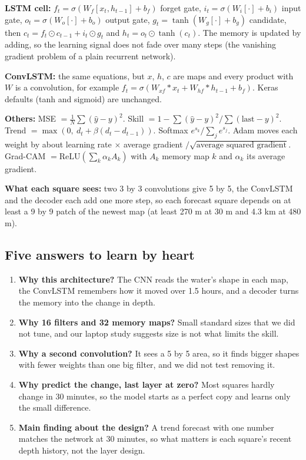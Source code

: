 \textbf{LSTM cell:} $f_t=\sigma(W_f[x_t,h_{t-1}]+b_f)$ forget gate, $i_t=\sigma(W_i[\cdot]+b_i)$ input gate, $o_t=\sigma(W_o[\cdot]+b_o)$ output gate, $g_t=\tanh(W_g[\cdot]+b_g)$ candidate, then $c_t=f_t\odot c_{t-1}+i_t\odot g_t$ and $h_t=o_t\odot\tanh(c_t)$. The memory is updated by adding, so the learning signal does not fade over many steps (the vanishing gradient problem of a plain recurrent network).

\textbf{ConvLSTM:} the same equations, but $x$, $h$, $c$ are maps and every product with $W$ is a convolution, for example $f_t=\sigma(W_{xf}*x_t+W_{hf}*h_{t-1}+b_f)$. Keras defaults (tanh and sigmoid) are unchanged.

\textbf{Others:} MSE $=\frac1N\sum(\hat y-y)^2$. Skill $=1-\sum(\hat y-y)^2/\sum(\text{last}-y)^2$. Trend $=\max(0,\ d_t+\beta(d_t-d_{t-1}))$. Softmax $e^{s_k}/\sum_j e^{s_j}$. Adam moves each weight by about learning rate $\times$ average gradient $/\sqrt{\text{average squared gradient}}$. Grad-CAM $=\text{ReLU}(\sum_k\alpha_kA_k)$ with $A_k$ memory map $k$ and $\alpha_k$ its average gradient.

\textbf{What each square sees:} two 3 by 3 convolutions give 5 by 5, the ConvLSTM and the decoder each add one more step, so each forecast square depends on at least a 9 by 9 patch of the newest map (at least 270 m at 30 m and 4.3 km at 480 m).

\subsection{Five answers to learn by heart}
\begin{enumerate}
\item \textbf{Why this architecture?} The CNN reads the water's shape in each map, the ConvLSTM remembers how it moved over 1.5 hours, and a decoder turns the memory into the change in depth.
\item \textbf{Why 16 filters and 32 memory maps?} Small standard sizes that we did not tune, and our laptop study suggests size is not what limits the skill.
\item \textbf{Why a second convolution?} It sees a 5 by 5 area, so it finds bigger shapes with fewer weights than one big filter, and we did not test removing it.
\item \textbf{Why predict the change, last layer at zero?} Most squares hardly change in 30 minutes, so the model starts as a perfect copy and learns only the small difference.
\item \textbf{Main finding about the design?} A trend forecast with one number matches the network at 30 minutes, so what matters is each square's recent depth history, not the layer design.
\end{enumerate}

